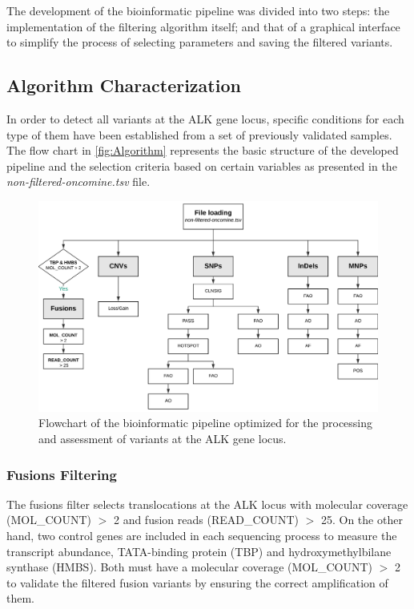 The development of the bioinformatic pipeline was divided into two steps: the implementation of the filtering algorithm itself; and that of a graphical interface to simplify the process of selecting parameters and saving the filtered variants.

\subsection{Algorithm Characterization}

In order to detect all variants at the ALK gene locus, specific conditions for each type of them have been established from a set of previously validated samples. The flow chart in \autoref{fig:Algorithm} represents the basic structure of the developed pipeline and the selection criteria based on certain variables as presented in the \textit{non-filtered-oncomine.tsv} file.

\begin{figure}[ht]
    \centering
    \includegraphics[width=\textwidth]{Images/chapter_4/mut_filtering.png}
    \caption{Flowchart of the bioinformatic pipeline optimized for the processing and assessment of variants at the ALK gene locus.}
    \label{fig:Algorithm}
\end{figure}

\subsubsection{Fusions Filtering}

The fusions filter selects translocations at the ALK locus with molecular coverage (MOL\_COUNT) $>$ 2 and fusion reads (READ\_COUNT) $>$ 25. On the other hand, two control genes are included in each sequencing process to measure the transcript abundance, TATA-binding protein (TBP) and hydroxymethylbilane synthase (HMBS). Both must have a molecular coverage (MOL\_COUNT) $>$ 2 to validate the filtered fusion variants by ensuring the correct amplification of them.

